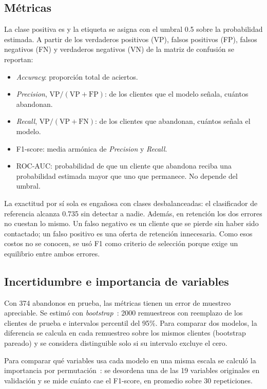 \subsection{Métricas}
La clase positiva es  y la etiqueta se asigna con el umbral 0.5 sobre la probabilidad
estimada. A partir de los verdaderos positivos (VP), falsos positivos (FP), falsos negativos (FN) y
verdaderos negativos (VN) de la matriz de confusión se reportan:
\begin{itemize}
    \item \emph{Accuracy}: proporción total de aciertos.
    \item \emph{Precision}, $\mathrm{VP}/(\mathrm{VP}+\mathrm{FP})$: de los clientes que el modelo
    señala, cuántos abandonan.
    \item \emph{Recall}, $\mathrm{VP}/(\mathrm{VP}+\mathrm{FN})$: de los clientes que abandonan,
    cuántos señala el modelo.
    \item F1-score: media armónica de \emph{Precision} y \emph{Recall}.
    \item ROC-AUC: probabilidad de que un cliente que abandona reciba una probabilidad estimada mayor
    que uno que permanece. No depende del umbral.
\end{itemize}

La exactitud por sí sola es engañosa con clases desbalanceadas: el clasificador de referencia alcanza
0.735 sin detectar a nadie. Además, en retención los dos errores no cuestan lo mismo. Un falso
negativo es un cliente que se pierde sin haber sido contactado; un falso positivo es una oferta de
retención innecesaria. Como esos costos no se conocen, se usó F1 como criterio de selección porque
exige un equilibrio entre ambos errores.

\subsection{Incertidumbre e importancia de variables}
Con 374 abandonos en prueba, las métricas tienen un error de muestreo apreciable. Se estimó con
\emph{bootstrap}~\cite{bootstrap}: 2000 remuestreos con reemplazo de los clientes de prueba e
intervalos percentil del 95\%. Para comparar dos modelos, la diferencia se calcula en cada remuestreo
sobre los mismos clientes (bootstrap pareado) y se considera distinguible solo si su intervalo
excluye el cero.

Para comparar qué variables usa cada modelo en una misma escala se calculó la importancia por
permutación~\cite{rf}: se desordena una de las 19 variables originales en validación y se mide cuánto
cae el F1-score, en promedio sobre 30 repeticiones.
